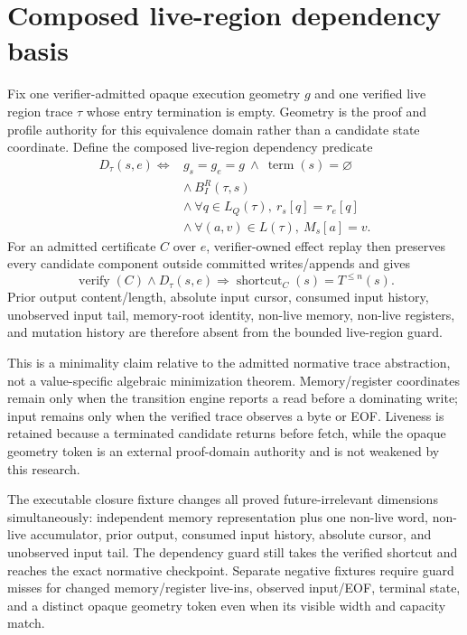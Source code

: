 \documentclass{article}
\begin{document}
\section{Composed live-region dependency basis}

Fix one verifier-admitted opaque execution geometry $g$ and one verified live
region trace $\tau$ whose entry termination is empty. Geometry is the proof and
profile authority for this equivalence domain rather than a candidate state
coordinate. Define the composed live-region dependency predicate
\begin{equation}
  \begin{aligned}
  D_{\tau}(s,e)\Longleftrightarrow{}&
    g_s=g_e=g\ \land\ \operatorname{term}(s)=\varnothing\\
    &\land\ B_I^R(\tau,s)\\
    &\land\ \forall q\in L_Q(\tau),\ r_s[q]=r_e[q]\\
    &\land\ \forall(a,v)\in L(\tau),\ M_s[a]=v.
  \end{aligned}
  \label{eq:state-graph-live-region-dependency-basis}
\end{equation}
For an admitted certificate $C$ over $e$, verifier-owned effect replay then
preserves every candidate component outside committed writes/appends and gives
\[
  \operatorname{verify}(C)\land D_{\tau}(s,e)
  \Longrightarrow
  \operatorname{shortcut}_C(s)=T^{\leq n}(s).
\]
Prior output content/length, absolute input cursor, consumed input history,
unobserved input tail, memory-root identity, non-live memory, non-live
registers,
and mutation history are therefore absent from the bounded live-region guard.

This is a minimality claim relative to the admitted normative trace abstraction,
not a value-specific algebraic minimization theorem. Memory/register coordinates
remain only when the transition engine reports a read before a dominating write;
input remains only when the verified trace observes a byte or EOF. Liveness is
retained because a terminated candidate returns before fetch, while the opaque
geometry token is an external proof-domain authority and is not weakened by this
research.

The executable closure fixture changes all proved future-irrelevant dimensions
simultaneously: independent memory representation plus one non-live word,
non-live accumulator, prior output, consumed input history, absolute cursor, and
unobserved input tail. The dependency guard still takes the verified shortcut
and reaches the exact normative checkpoint. Separate negative fixtures require
guard misses for changed memory/register live-ins, observed input/EOF, terminal
state, and a distinct opaque geometry token even when its visible width and
capacity match.
\end{document}
